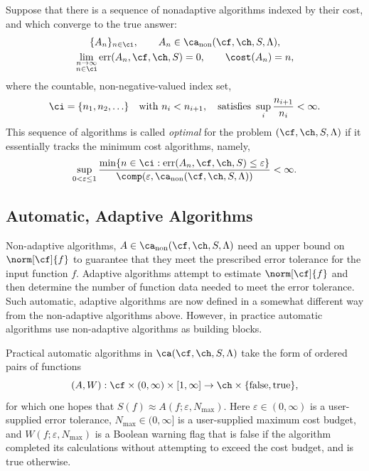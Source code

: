 \documentclass[]{elsarticle}
\DeclareMathOperator{\fix}{non}
\DeclareMathOperator{\err}{err}
\theoremstyle{definition}
\theoremstyle{remark}
\begin{document}
Suppose that there is a sequence of nonadaptive algorithms indexed by their cost, and which converge to the true answer:
\begin{subequations} \label{algseqdef}
\begin{gather} 
\{A_n\}_{n \in \ci}, \qquad A_n  \in \ca_{\fix}(\cf,\ch,S,\Lambda), \\
\lim_{\substack{n \to \infty\\ n \in \ci}} \err(A_n,\cf,\ch,S) = 0, \qquad \cost(A_n) = n,  
\end{gather}
\end{subequations}
where the countable, non-negative-valued index set, 
\begin{equation} \label{indexdef}
\ci=\{n_1, n_2, \ldots\} \quad \text{with } n_i < n_{i+1}, \quad \text{satisfies } \sup_i \frac{n_{i+1}}{n_i} <\infty. 
\end{equation} 
This sequence of algorithms is called \emph{optimal} for the problem $(\cf,\ch,S,\Lambda)$ if it essentially tracks the minimum cost algorithms, namely,
\begin{equation} \label{nearoptdef}
\sup_{0 < \varepsilon \le 1} \frac{\min\{n \in \ci : \err(A_n,\cf,\ch,S) \le \varepsilon\}} {\comp(\varepsilon,\ca_{\fix}(\cf,\ch,S,\Lambda))} <\infty.
\end{equation}

\subsection{Automatic, Adaptive Algorithms} \label{AutoAlgsec}

Non-adaptive algorithms, $A \in \ca_{\fix}(\cf,\ch,S,\Lambda)$ need an upper bound on $\norm[\cf]{f}$ to guarantee that they meet the prescribed error tolerance for the input function $f$.  Adaptive algorithms attempt to estimate $\norm[\cf]{f}$ and then determine the number of function data needed to meet the error tolerance.  Such automatic, adaptive algorithms are now defined in a somewhat different way from the non-adaptive algorithms above.  However, in practice automatic algorithms use non-adaptive algorithms as building blocks.

Practical automatic algorithms in $\ca(\cf,\ch,S,\Lambda)$ take the form of ordered pairs of functions
\[
(A,W): \cf \times (0,\infty)\times [1,\infty] \to \ch \times \{\text{false},\text{true}\},
\]
for which one hopes that $S(f) \approx A(f;\varepsilon,N_{\max})$.  Here $\varepsilon \in (0,\infty)$ is a user-supplied error tolerance, $N_{\max} \in (0,\infty]$ is a user-supplied maximum cost budget, and $W(f;\varepsilon,N_{\max})$ is a Boolean warning flag that is false if the algorithm completed its calculations without attempting to exceed the cost budget, and is true otherwise.  
\end{document}

